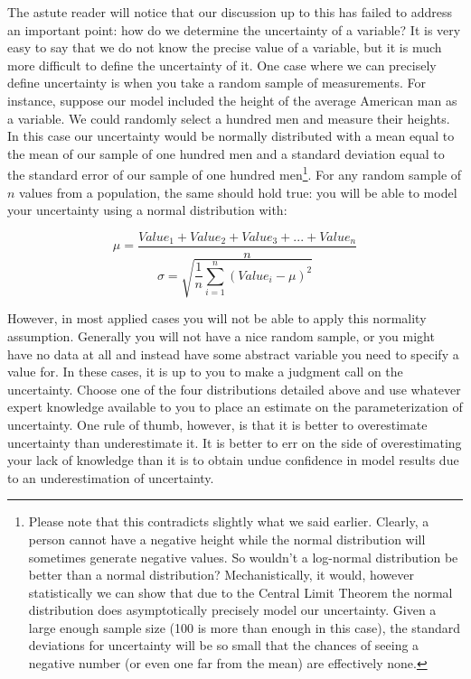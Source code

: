 \documentclass[]{memoir}
\begin{document}
The astute reader will notice that our discussion up to this has failed
to address an important point: how do we determine the uncertainty of a
variable? It is very easy to say that we do not know the precise value
of a variable, but it is much more difficult to define the uncertainty
of it. One case where we can precisely define uncertainty is when you
take a random sample of measurements. For instance, suppose our model
included the height of the average American man as a variable. We could
randomly select a hundred men and measure their heights. In this case
our uncertainty would be normally distributed with a mean equal to the
mean of our sample of one hundred men and a standard deviation equal to
the standard error of our sample of one hundred men\footnote{Please note
  that this contradicts slightly what we said earlier. Clearly, a person
  cannot have a negative height while the normal distribution will
  sometimes generate negative values. So wouldn't a log-normal
  distribution be better than a normal distribution? Mechanistically, it
  would, however statistically we can show that due to the Central Limit
  Theorem the normal distribution does asymptotically precisely model
  our uncertainty. Given a large enough sample size (100 is more than
  enough in this case), the standard deviations for uncertainty will be
  so small that the chances of seeing a negative number (or even one far
  from the mean) are effectively none.}. For any random sample of $n$
values from a population, the same should hold true: you will be able to
model your uncertainty using a normal distribution with:

\[ \mu = \frac{Value_1+Value_2+Value_3+...+Value_n}{n} \]
\[ \sigma = \sqrt{\frac{1}{n} \sum_{i=1}^n (Value_i-\mu)^2} \]

However, in most applied cases you will not be able to apply this
normality assumption. Generally you will not have a nice random sample,
or you might have no data at all and instead have some abstract variable
you need to specify a value for. In these cases, it is up to you to make
a judgment call on the uncertainty. Choose one of the four distributions
detailed above and use whatever expert knowledge available to you to
place an estimate on the parameterization of uncertainty. One rule of
thumb, however, is that it is better to overestimate uncertainty than
underestimate it. It is better to err on the side of overestimating your
lack of knowledge than it is to obtain undue confidence in model results
due to an underestimation of uncertainty.
\end{document}
